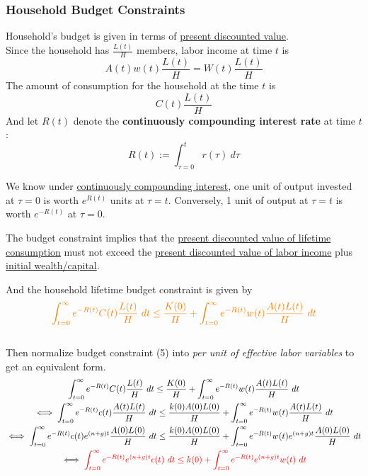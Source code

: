 \documentclass[11pt]{article}
\begin{document}
	\subsubsection{Household Budget Constraints}
	\par Household's budget is given in terms of \ul{present discounted value}. \\
	Since the household has $\frac{L(t)}{H}$ members, labor income at time $t$ is 
	\begin{equation}
		A(t)w(t)\frac{L(t)}{H} = W(t)\frac{L(t)}{H}
	\end{equation}
	The amount of consumption for the household at the time $t$ is 
	\begin{equation}
		C(t)\frac{L(t)}{H}
	\end{equation}
	And let $R(t)$ denote the \textbf{continuously compounding interest rate} at time $t$:
	\begin{equation}
		R(t) := \int_{\tau=0}^t r(\tau)\ d\tau
	\end{equation}
	\begin{remark}
		We know under \ul{continuously compounding interest}, one unit of output invested at $\tau=0$ is worth $e^{R(t)}$ units at $\tau=t$. Conversely, 1 unit of output at $\tau=t$ is worth $e^{-R(t)}$ at $\tau=0$.
	\end{remark}
	\begin{remark}
		The budget constraint implies that the \ul{present discounted value of lifetime consumption} must not exceed the \ul{present discounted value of labor income} plus \ul{initial wealth/capital}.
	\end{remark}
	\par And the household lifetime budget constraint is given by
	\begin{equation}
		\textcolor{orange}{
			\int_{t=0}^\infty e^{-R(t)} C(t) \frac{L(t)}{H}\ dt \leq \frac{K(0)}{H} + \int_{t=0}^\infty e^{-R(t)} w(t) \frac{A(t)L(t)}{H}\ dt
		}
	\end{equation}
	\\
	Then normalize budget constraint (5) into \emph{per unit of effective labor variables} to get an equivalent form.
	\begin{gather}
		\int_{t=0}^\infty e^{-R(t)} C(t) \frac{L(t)}{H}\ dt  \leq \frac{K(0)}{H} + \int_{t=0}^\infty e^{-R(t)} w(t) \frac{A(t)L(t)}{H}\ dt \\
		\iff 
		\int_{t=0}^\infty e^{-R(t)} c(t) \frac{A(t)L(t)}{H}\ dt \leq \frac{k(0)A(0)L(0)}{H} + \int_{t=0}^\infty e^{-R(t)} w(t) \frac{A(t)L(t)}{H}\ dt \\ 
		\iff \int_{t=0}^\infty e^{-R(t)} c(t) e^{(n+g)t} \frac{A(0)L(0)}{H}\ dt \leq \frac{k(0)A(0)L(0)}{H} + \int_{t=0}^\infty e^{-R(t)} w(t) e^{(n+g)t}\frac{A(0)L(0)}{H}\ dt \\
		\iff \textcolor{red}{\int_{t=0}^\infty e^{-R(t)} e^{(n+g)t} c(t)\ dt \leq k(0) + \int_{t=0}^\infty e^{-R(t)} e^{(n+g)t} w(t)\ dt}
	\end{gather}
\end{document}

